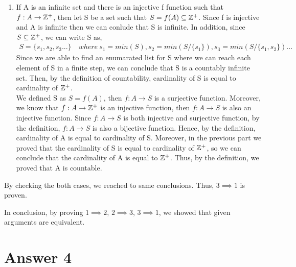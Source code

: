\documentclass[11pt]{article}
\newcommand{\Z}{\mathbb{Z}}
\begin{document}
\begin{enumerate}
\begin{enumerate}
    	\item
    	If A is an infinite set and there is an injective f function such that $f: A \rightarrow \Z\textsuperscript{+}$, then let S be a set such that $S = f(A) \subseteq \Z\textsuperscript{+}$. Since f is injective and A is infinite then we can conlude that S is infinite. In addition, since $S \subseteq \Z\textsuperscript{+}$, we can write S as,
    	\begin{equation*}
    	\begin{split}
    	S = \{s_{1},s_{2},s_{3}...\} \quad where \ s_{1} = min(S), s_{2} = min(S/\{s_{1}\}), s_{3} = min(S/\{s_{1},s_{2}\}) ...
    	\end{split}
    	\end{equation*}
    	Since we are able to find an enumarated list for S where we can reach each element of S in a finite step, we can conclude that S is a countably infinite set. Then, by the definition of countability, cardinality of S is equal to cardinality of 	$\Z\textsuperscript{+}$.\\
    	We defined S as $S = f(A)$, then $f:A\rightarrow S$ is a surjective function. Moreover, we know that $f: A \rightarrow \Z\textsuperscript{+}$ is an injective function, then $f: A \rightarrow S$ is also an injective function. Since $f: A \rightarrow S$ is both injective and surjective function, by the definition, $f: A \rightarrow S$ is also a bijective function. Hence, by the definition, cardinality of A is equal to cardinality of S. Moreover, in the previous part we proved that the cardinality of S is equal to cardinality of $\Z\textsuperscript{+}$, so we can conclude that the cardinality of A is equal to $\Z\textsuperscript{+}$. Thus, by the definition, we proved that A is countable.
    	
    	
    \end{enumerate}
    By checking the both cases, we reached to same conclusions. Thus, $3 \implies 1$ is proven.
    
\end{enumerate}

In conclusion, by proving $1 \implies 2$, $2 \implies 3$, $3 \implies 1$, we showed that given arguments are equivalent.

\section*{Answer 4}
\end{document}
